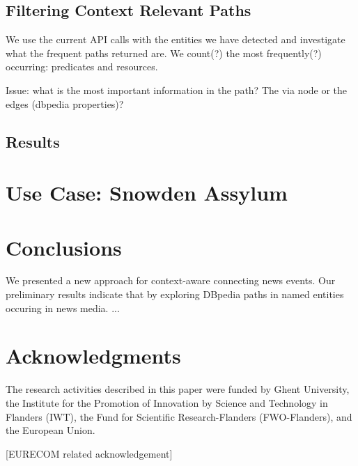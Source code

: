 \documentclass{acm_proc_article-sp}
\begin{document}
\subsection{Filtering Context Relevant Paths}

We use the current API calls with the entities we have detected and investigate what the frequent paths returned are. We count(?) the most frequently(?) occurring:
predicates and resources.

Issue: what is the most important information in the path? The via node or the edges (dbpedia properties)?







\subsection{Results}



\section{Use Case: Snowden Assylum}


\section{Conclusions}
We presented a new approach for context-aware connecting news events. Our preliminary results indicate that by exploring DBpedia paths in named entities occuring in news media. ...

\section{Acknowledgments}
The research activities described in this paper were funded by Ghent University,
the Institute for the Promotion of Innovation by Science and Technology in Flanders (IWT), the Fund for Scientific Research-Flanders (FWO-Flanders), and the European Union.

[EURECOM related acknowledgement]

%

%
%
\end{document}
